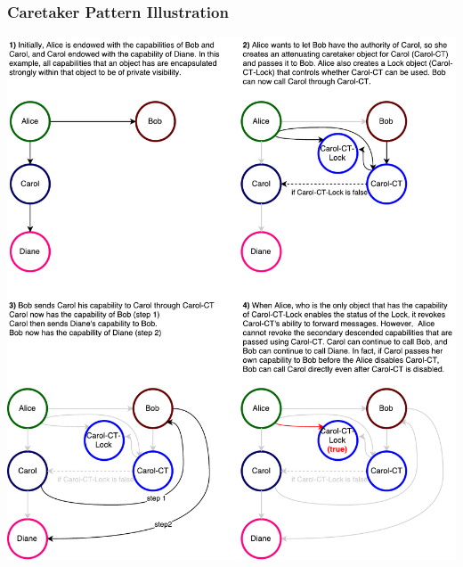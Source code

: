 \documentclass[a4paper,11pt,twoside]{article}
\begin{document}
{\begin{minipage}{\textwidth}
\subsubsection{Caretaker Pattern Illustration}\label{sec:figcaretaker}
\centering
\includegraphics[width=1.05\textwidth]{figures/Caretaker.pdf}
  \label{fig:figcaretaker}
\end{minipage}


\begin{minipage}{\textwidth}

\end{minipage}}
\end{document}
